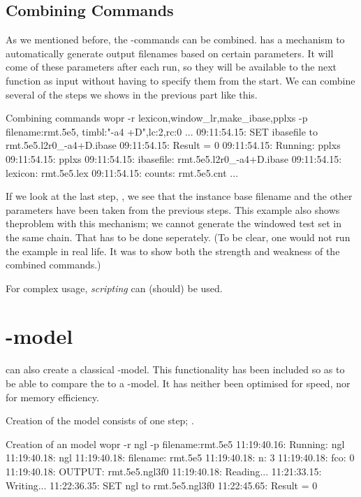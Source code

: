 \documentclass[a4paper,10pt,twoside]{report}
\begin{document}
\subsection{Combining Commands}

As we mentioned before, the \wopr{}-commands can be combined. \Wopr{}
has a mechanism to automatically generate output filenames based on
certain parameters. It will  come of these parameters after
each run, so they will be available to the next function as input
without having to specify them from the start. We can combine several
of the steps we shows in the previous part like this.

\begin{bash}{Combining commands}
wopr -r lexicon,window_lr,make_ibase,pplxs -p filename:rmt.5e5,
                                              timbl:"-a4 +D",lc:2,rc:0
...
09:11:54.15: SET ibasefile to rmt.5e5.l2r0_-a4+D.ibase
09:11:54.15: Result = 0
09:11:54.15: Running: pplxs
09:11:54.15: pplxs
09:11:54.15:  ibasefile:      rmt.5e5.l2r0_-a4+D.ibase
09:11:54.15:  lexicon:        rmt.5e5.lex
09:11:54.15:  counts:         rmt.5e5.cnt
...
\end{bash}

If we look at the last step, , we see that the instance
base filename and the other parameters have been taken from the
previous steps. This example also shows theproblem with this
mechanism; we cannot generate the windowed test set in the same
chain. That has to be done seperately. (To be clear, one would not run
the example in real life. It was to show both the strength and
weakness of the combined commands.) 

For complex \wopr{} usage, \emph{scripting} can (should) be used.

\section{\ngram{}-model}

\Wopr{} can also create a classical \ngram{}-model. This functionality
has been included so as to be able to compare the \mb{} \lm{} to a 
 \ngram{}-model. It has neither been optimised for speed,
nor for memory efficiency.

Creation of the model consists of one step; .

\begin{bash}{Creation of an \ngram{} model}
wopr -r ngl -p filename:rmt.5e5
11:19:40.16: Running: ngl
11:19:40.18: ngl
11:19:40.18:  filename:  rmt.5e5
11:19:40.18:  n:         3
11:19:40.18:  fco:       0
11:19:40.18:  OUTPUT:    rmt.5e5.ngl3f0
11:19:40.18: Reading...
11:21:33.15: Writing...
11:22:36.35: SET ngl to rmt.5e5.ngl3f0
11:22:45.65: Result = 0
\end{bash}
\end{document}
